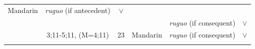 \documentclass[oneside]{report}
\theoremstyle{definition}
\theoremstyle{definition}
\theoremstyle{definition}
\theoremstyle{remark}
\begin{document}
\begin{longtable}[]{@{}lccclc@{}}
\begin{minipage}[t]{0.10\columnwidth}
Mandarin\strut
\end{minipage} & \begin{minipage}[t]{0.25\columnwidth}\raggedright\strut
\emph{ruguo} (if antecedent)\strut
\end{minipage} & \begin{minipage}[t]{0.13\columnwidth}\centering\strut
\(\lor\)\strut
\end{minipage}\tabularnewline
\begin{minipage}[t]{0.23\columnwidth}\raggedright\strut
\strut
\end{minipage} & \begin{minipage}[t]{0.07\columnwidth}\centering\strut
\strut
\end{minipage} & \begin{minipage}[t]{0.05\columnwidth}\centering\strut
\strut
\end{minipage} & \begin{minipage}[t]{0.10\columnwidth}\centering\strut
\strut
\end{minipage} & \begin{minipage}[t]{0.25\columnwidth}\raggedright\strut
\emph{ruguo} (if consequent)\strut
\end{minipage} & \begin{minipage}[t]{0.13\columnwidth}\centering\strut
\(\lor\)\strut
\end{minipage}\tabularnewline
\begin{minipage}[t]{0.23\columnwidth}\raggedright\strut
\strut
\end{minipage} & \begin{minipage}[t]{0.07\columnwidth}\centering\strut
3;11-5;11, (M=4;11)\strut
\end{minipage} & \begin{minipage}[t]{0.05\columnwidth}\centering\strut
23\strut
\end{minipage} & \begin{minipage}[t]{0.10\columnwidth}\centering\strut
Mandarin\strut
\end{minipage} & \begin{minipage}[t]{0.25\columnwidth}\raggedright\strut
\emph{ruguo} (if consequent)\strut
\end{minipage} & \begin{minipage}[t]{0.13\columnwidth}\centering\strut
\(\lor\)\strut
\end{minipage}\tabularnewline
\begin{minipage}[t]{0.23\columnwidth}\raggedright\strut
\strut
\end{minipage} & \begin{minipage}[t]{0.07\columnwidth}\centering\strut

\end{minipage}
\end{longtable}
\end{document}
